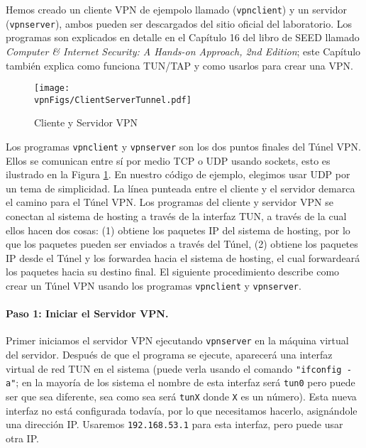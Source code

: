 Hemos creado un cliente VPN de ejempolo llamado (\texttt{vpnclient}) y un servidor  (\texttt{vpnserver}), ambos pueden ser descargados del sitio oficial del laboratorio.
Los programas son explicados en detalle en el Capítulo 16 del libro de SEED llamado \textit{Computer \& Internet Security: A Hands-on Approach, 2nd Edition}; este Capítulo también explica como funciona TUN/TAP y como usarlos para crear una VPN.


\begin{figure}[htb]
\begin{center}
\texttt{[image: \\vpnFigs/ClientServerTunnel.pdf]}
\end{center}
\caption{Cliente y Servidor VPN}
\label{vpn:fig:client_server}
\end{figure}

Los programas \texttt{vpnclient} y \texttt{vpnserver} son los dos puntos finales del Túnel VPN. Ellos se comunican entre sí por medio TCP o UDP usando sockets, esto es ilustrado en la Figura \ref{vpn:fig:client_server}. En nuestro código de ejemplo, elegimos usar UDP por un tema de simplicidad. La línea punteada entre el cliente y el servidor demarca el camino para el Túnel VPN.
Los programas del cliente y servidor VPN se conectan al sistema de hosting a través de la interfaz TUN, a través de la cual ellos hacen dos cosas: (1) obtiene los paquetes IP del sistema de hosting, por lo que los paquetes pueden ser enviados a través del Túnel, (2) obtiene los paquetes IP desde el Túnel y los forwardea hacia el sistema de hosting, el cual forwardeará los paquetes hacia su destino final.
El siguiente procedimiento describe como crear un Túnel VPN usando los programas \texttt{vpnclient} y \texttt{vpnserver}.


\paragraph{Paso 1: Iniciar el Servidor VPN.} 
Primer iniciamos el servidor VPN ejecutando \texttt{vpnserver} en la máquina virtual del servidor.
Después de que el programa se ejecute, aparecerá una interfaz virtual de red TUN en el sistema (puede verla usando el comando \texttt{"ifconfig -a"}; en la mayoría de los sistema el nombre de esta interfaz será \texttt{tun0} pero puede ser que sea diferente, sea como sea será \texttt{tunX} donde \texttt{X} es un número).
Esta nueva interfaz no está configurada todavía, por lo que necesitamos hacerlo, asignándole una dirección IP. Usaremos \texttt{192.168.53.1} para esta interfaz, pero puede usar otra IP.

